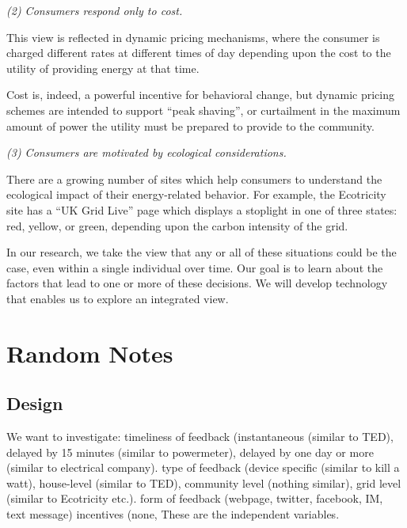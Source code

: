 {\em (2) Consumers respond only to cost.}

This view is reflected in dynamic pricing mechanisms, where the consumer is
charged different rates at different times of day depending upon the cost
to the utility of providing energy at that time.

Cost is, indeed, a powerful incentive for behavioral change, but dynamic
pricing schemes are intended to support ``peak shaving'', or curtailment in
the maximum amount of power the utility must be prepared to provide to the
community.

{\em (3) Consumers are motivated by ecological considerations.}

There are a growing number of sites which help consumers to understand the
ecological impact of their energy-related behavior.  For example, the
Ecotricity site has a ``UK Grid Live'' page which displays a stoplight in
one of three states: red, yellow, or green, depending upon the carbon
intensity of the grid.  

In our research, we take the view that any or all of these situations could
be the case, even within a single individual over time. Our goal is to
learn about the factors that lead to one or more of these decisions. We
will develop technology that enables us to explore an integrated view.













\section{Random Notes}

\subsection{Design}

We want to investigate: timeliness of feedback (instantaneous (similar to
TED), delayed by 15 minutes (similar to powermeter), delayed by one day or
more (similar to electrical company).  type of feedback (device specific
(similar to kill a watt), house-level (similar to TED), community level
(nothing similar), grid level (similar to Ecotricity etc.).  form of
feedback (webpage, twitter, facebook, IM, text message)  incentives (none,  These are the
independent variables.  

